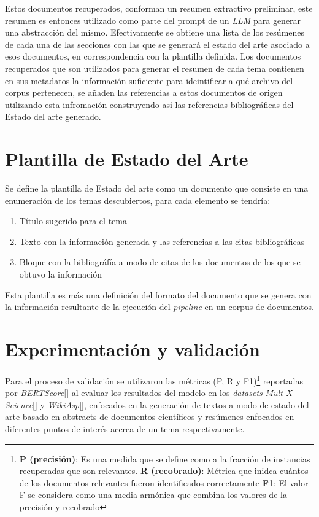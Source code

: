     Estos documentos recuperados, conforman un resumen extractivo preliminar, este resumen es entonces utilizado como parte del prompt de un \emph{LLM} para generar una abstracción del mismo. Efectivamente se obtiene una lista de los resúmenes de cada una de las secciones con las que se generará el estado del arte asociado a esos documentos, en correspondencia con la plantilla definida.
    Los documentos recuperados que son utilizados para generar el resumen de cada tema contienen en sus metadatos la información suficiente para ideintificar a qué archivo del corpus pertenecen, se añaden las referencias a estos documentos de origen utilizando esta infromación construyendo así las referencias bibliográficas del Estado del arte generado.


\section{Plantilla de Estado del Arte}
Se define la plantilla de Estado del arte como un documento que consiste en una enumeración de los temas descubiertos, 
para cada elemento se tendría:
\begin{enumerate}
    \item Título sugerido para el tema
    \item Texto con la información generada y las referencias a las citas bibliográficas
    \item Bloque con la bibliográfía a modo de citas de los documentos de los que se obtuvo la información
\end{enumerate}

Esta plantilla es más una definición del formato del documento que se genera con la información resultante de la ejecución del \emph{pipeline} en un corpus de documentos.

\section{Experimentación y validación}
Para el proceso de validación se utilizaron las m\'etricas (P, R y F1)\footnote{\textbf{P (precisión)}: Es una medida que se define como a la fracción de instancias recuperadas que son relevantes. \textbf{R (recobrado)}: M\'etrica que inidca cu\'antos de los documentos relevantes fueron identificados correctamente \textbf{F1}: El valor F se considera como una media armónica que combina los valores de la precisión y recobrado} reportadas por \emph{BERTScore}[\cite{bertscore}] al evaluar los resultados del modelo en los \emph{datasets} \emph{Mult-X-Science}[\cite{multixscience}] y \emph{WikiAsp}[\cite{wikiasp}], enfocados en la generación de textos a modo de estado del arte basado en abstracts de documentos científicos y resúmenes enfocados en diferentes puntos de interés acerca de un tema respectivamente.

